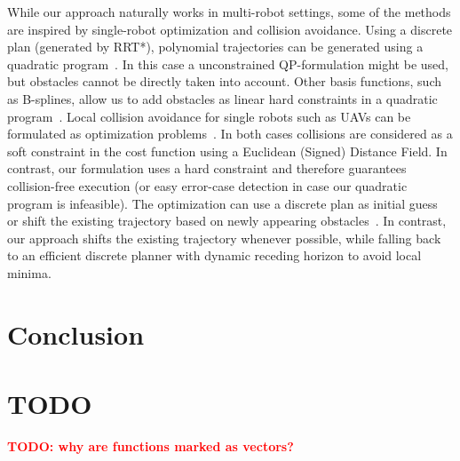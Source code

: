 \documentclass{svproc}
\newcommand{\todo}[1]{\textbf{\textcolor{red}{TODO: #1}}}
\begin{document}
While our approach naturally works in multi-robot settings, some of the methods are inspired by single-robot optimization and collision avoidance.
Using a discrete plan (generated by RRT*), polynomial trajectories can be generated using a quadratic program~\cite{richterISRR}.
In this case a unconstrained QP-formulation might be used, but obstacles cannot be directly taken into account.
Other basis functions, such as B-splines, allow us to add obstacles as linear hard constraints in a quadratic program~\cite{flores,tang}.
Local collision avoidance for single robots such as UAVs can be formulated as optimization problems~\cite{replanning-eth,replanning-usenko}.
In both cases collisions are considered as a soft constraint in the cost function using a Euclidean (Signed) Distance Field.
In contrast, our formulation uses a hard constraint and therefore guarantees collision-free execution (or easy error-case detection in case our quadratic program is infeasible).
The optimization can use a discrete plan as initial guess~\cite{replanning-eth} or shift the existing trajectory based on newly appearing obstacles~\cite{replanning-usenko}.
In contrast, our approach shifts the existing trajectory whenever possible, while falling back to an efficient discrete planner with dynamic receding horizon to avoid local minima.








\section{Conclusion}

%
%



\section{TODO}

\todo{why are functions marked as vectors?}

% 
\end{document}
